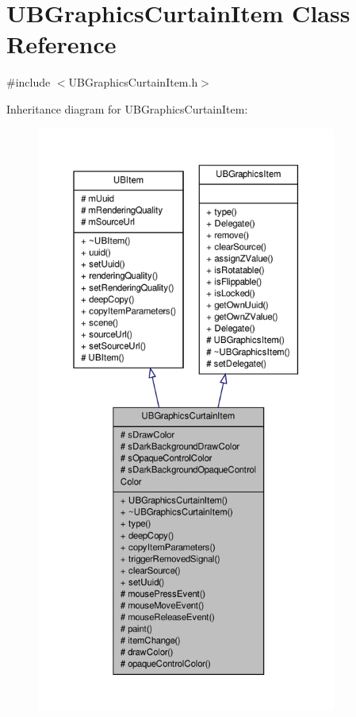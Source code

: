 \hypertarget{class_u_b_graphics_curtain_item}{\section{U\-B\-Graphics\-Curtain\-Item Class Reference}
\label{d5/d13/class_u_b_graphics_curtain_item}
}


{\ttfamily \#include $<$U\-B\-Graphics\-Curtain\-Item.\-h$>$}



Inheritance diagram for U\-B\-Graphics\-Curtain\-Item\-:
\nopagebreak
\begin{figure}[H]
\begin{center}
\leavevmode
\includegraphics[height=550pt]{d0/d82/class_u_b_graphics_curtain_item__inherit__graph}
\end{center}
\end{figure}


